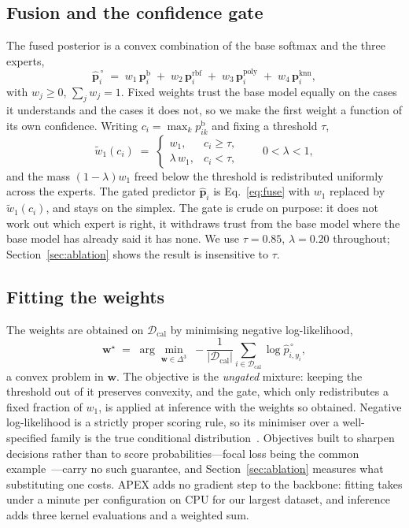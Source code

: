 \documentclass[conference]{IEEEtran}
\begin{document}
\subsection{Fusion and the confidence gate}
The fused posterior is a convex combination of the base softmax and the three
experts,
\begin{equation}
\hat{\mathbf{p}}^{\,\circ}_i \;=\; w_1\,\mathbf{p}^{\mathrm{b}}_i \;+\; w_2\,\mathbf{p}^{\mathrm{rbf}}_i
\;+\; w_3\,\mathbf{p}^{\mathrm{poly}}_i \;+\; w_4\,\mathbf{p}^{\mathrm{knn}}_i,
\label{eq:fuse}
\end{equation}
with $w_j \ge 0$, $\sum_j w_j = 1$. Fixed weights trust the base model equally on
the cases it understands and the cases it does not, so we make the first weight a
function of its own confidence. Writing $c_i = \max_k p^{\mathrm{b}}_{ik}$ and
fixing a threshold $\tau$,
\begin{equation}
\tilde{w}_1(c_i) \;=\;
\begin{cases}
w_1, & c_i \ge \tau,\\[2pt]
\lambda\,w_1, & c_i < \tau,
\end{cases}
\qquad 0 < \lambda < 1,
\label{eq:gate}
\end{equation}
and the mass $\left(1-\lambda\right) w_1$ freed below the threshold is
redistributed uniformly across the experts. The gated predictor
$\hat{\mathbf{p}}_i$ is Eq.~\ref{eq:fuse} with $w_1$ replaced by
$\tilde{w}_1(c_i)$, and stays on the simplex. The gate is crude on purpose: it does
not work out which expert is right, it withdraws trust from the base model where
the base model has already said it has none. We use $\tau = 0.85$,
$\lambda = 0.20$ throughout; Section~\ref{sec:ablation} shows the result is
insensitive to $\tau$.

\subsection{Fitting the weights}
The weights are obtained on $\mathcal{D}_{\mathrm{cal}}$ by minimising negative
log-likelihood,
\begin{equation}
\mathbf{w}^{\star} \;=\; \arg\min_{\mathbf{w} \in \Delta^{3}}
\; -\frac{1}{|\mathcal{D}_{\mathrm{cal}}|}
\sum_{i \in \mathcal{D}_{\mathrm{cal}}} \log \hat{p}^{\,\circ}_{i, y_i},
\label{eq:nll}
\end{equation}
a convex problem in $\mathbf{w}$. The objective is the \emph{ungated} mixture:
keeping the threshold out of it preserves convexity, and the gate, which only
redistributes a fixed fraction of $w_1$, is applied at inference with the weights
so obtained. Negative log-likelihood is a strictly proper scoring rule, so its
minimiser over a well-specified family is the true conditional
distribution~\cite{gneiting2007strictly}. Objectives built to sharpen decisions
rather than to score probabilities---focal loss being the common
example~\cite{mukhoti2020calibrating}---carry no such guarantee, and
Section~\ref{sec:ablation} measures what substituting one costs. APEX adds no
gradient step to the backbone: fitting takes under a minute per configuration on
CPU for our largest dataset, and inference adds three kernel evaluations and a
weighted sum.
\end{document}
